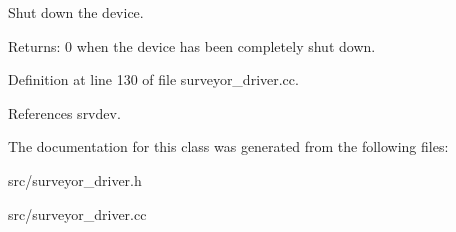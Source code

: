 Shut down the device. 

\begin{Desc}
\item[Returns:]0 when the device has been completely shut down. \end{Desc}


Definition at line 130 of file surveyor\_\-driver.cc.

References srvdev.

The documentation for this class was generated from the following files:\begin{CompactItemize}
\item 
src/surveyor\_\-driver.h\item 
src/surveyor\_\-driver.cc\end{CompactItemize}
